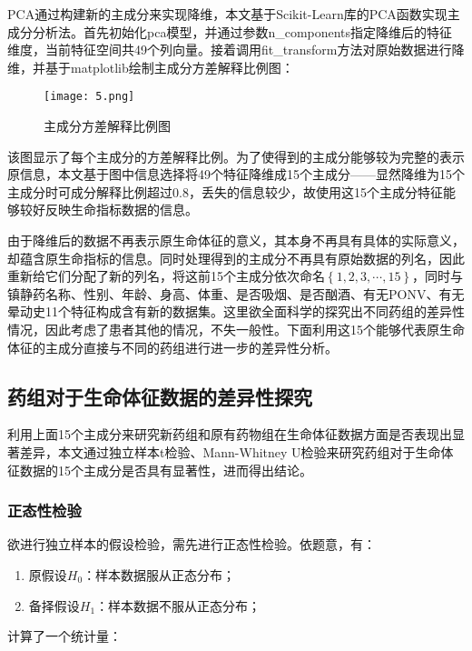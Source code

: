 PCA通过构建新的主成分来实现降维，本文基于Scikit-Learn库的PCA函数实现主成分分析法。首先初始化pca模型，并通过参数n\_components指定降维后的特征维度，当前特征空间共49个列向量。接着调用fit\_transform方法对原始数据进行降维，并基于matplotlib绘制主成分方差解释比例图：

\begin{figure}[H] %
	\centering %
	\texttt{[image: 5.png]} 
	\caption{主成分方差解释比例图} 
	\label{Fig.main5} 
\end{figure}

该图显示了每个主成分的方差解释比例。为了使得到的主成分能够较为完整的表示原信息，本文基于图中信息选择将49个特征降维成15个主成分——显然降维为15个主成分时可成分解释比例超过0.8，丢失的信息较少，故使用这15个主成分特征能够较好反映生命指标数据的信息。

由于降维后的数据不再表示原生命体征的意义，其本身不再具有具体的实际意义，却蕴含原生命指标的信息。同时处理得到的主成分不再具有原始数据的列名，因此重新给它们分配了新的列名，将这前15个主成分依次命名$\left\{ 1,2,3,\cdots ,15 \right\}$，同时与镇静药名称、性别、年龄、身高、体重、是否吸烟、是否酗酒、有无PONV、有无晕动史11个特征构成含有新的数据集。这里欲全面科学的探究出不同药组的差异性情况，因此考虑了患者其他的情况，不失一般性。下面利用这15个能够代表原生命体征的主成分直接与不同的药组进行进一步的差异性分析。

\subsection{药组对于生命体征数据的差异性探究}

利用上面15个主成分来研究新药组和原有药物组在生命体征数据方面是否表现出显著差异，本文通过独立样本t检验、Mann-Whitney U检验来研究药组对于生命体征数据的15个主成分是否具有显著性，进而得出结论。

\subsubsection{正态性检验}

欲进行独立样本的假设检验，需先进行正态性检验。依题意，有：

\begin{enumerate}
  \item 原假设${{H}_{0}}$：样本数据服从正态分布；
  \item 备择假设${{H}_{1}}$：样本数据不服从正态分布；
\end{enumerate}

计算了一个统计量：

